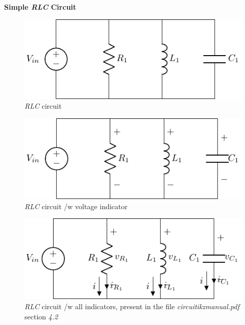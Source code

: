\documentclass[a4paper, 12pt]{report}
\begin{document}
    \begin{center}
        \huge \textbf{Simple \textit{RLC} Circuit}
    \end{center}
    \begin{figure}[!h]
        \centering
        \includegraphics{./rlcCircuit/circuit.pdf}
        \caption{\textit{RLC} circuit}
    \end{figure}
    \begin{figure}[!h]
        \centering
        \includegraphics{./rlcCircuitWithVoltageIndicator/circuit.pdf}
        \caption{\textit{RLC} circuit /w voltage indicator}
    \end{figure}
    \begin{figure}[!h]
        \centering
        \includegraphics{./rlcCircuitWithAllIndicator/circuit.pdf}
        \caption{\textit{RLC} circuit /w all indicators, present in the file \textit{circuitikzmanual.pdf} section \textit{4.2}}
    \end{figure}
\end{document}
